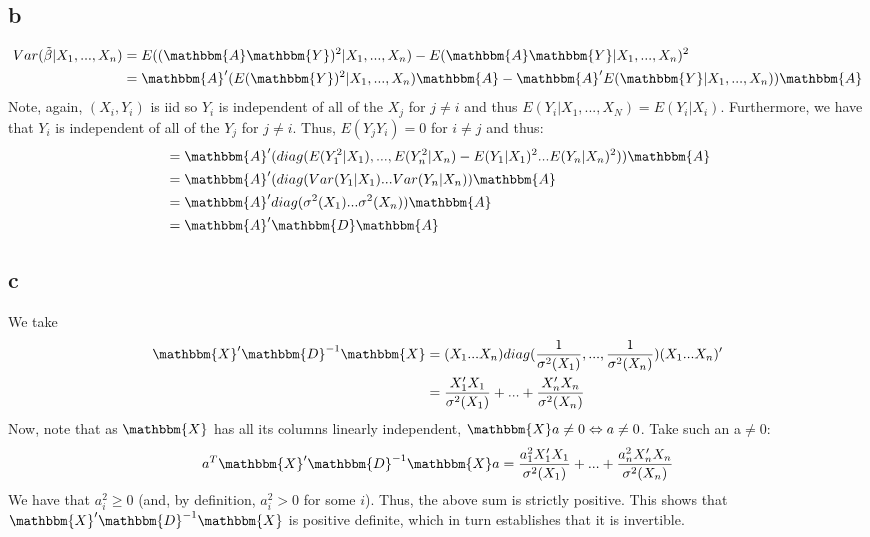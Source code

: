 \documentclass{article}
\begin{document}
\subsection*{b}
\begin{align*}
    Var(\tilde \beta | X_1,...,X_n) & = E((\mathbbm{A} \mathbbm{Y})^2|X_1,...,X_n ) - E(\mathbbm{A} \mathbbm{Y}|X_1,...,X_n )^2 \\
&= \mathbbm{A}'(E( \mathbbm{Y})^2|X_1,...,X_n )\mathbbm{A} - \mathbbm{A}'E( \mathbbm{Y}|X_1,...,X_n )) \mathbbm{A} \\
\end{align*}
Note, again, $(X_i,Y_i)$ is iid so $Y_i$ is independent of all of the $X_j$ for $j \neq i$ and thus $E(Y_i|X_1,...,X_N) = E(Y_i|X_i)$. Furthermore, we have that $Y_i$ is
independent of all of the $Y_j$ for $j \neq i$. Thus, $E(Y_jY_i) = 0 $ for $i \neq j$ and thus:
\begin{align*}
&= \mathbbm{A}'(diag(E( Y_1^2|X_1 ),...,E( Y_n^2|X_n ) - E( Y_1|X_ 1)^2...E( Y_n|X_n )^2)) \mathbbm{A} \\
&= \mathbbm{A}'(diag(Var( Y_1|X_1 )...Var( Y_n|X_n )) \mathbbm{A} \\
& = \mathbbm{A}'diag(\sigma^2(X_1 )...\sigma^2(X_n )) \mathbbm{A} \\ 
& = \mathbbm{A}'\mathbbm{D} \mathbbm{A}
\end{align*}

\subsection*{c}
We take
\begin{align*}
    \mathbbm{X}' \mathbbm{D}^{-1} \mathbbm{X} &= (X_1 ... X_n) diag(\frac{1}{\sigma^2(X_1)},...,\frac{1}{\sigma^2(X_n)})(X_1 ... X_n)'\\
    & =\frac{X_1'X_1}{\sigma^2(X_1)}+...+\frac{X_n'X_n}{\sigma^2(X_n)} \\
\end{align*}
Now, note that as $\mathbbm{X}$ has all its columns linearly independent, $\mathbbm{X}a \neq 0 \Leftrightarrow a \neq 0$. 
Take such an a$\neq 0$: 
\begin{align*}
    a^T \mathbbm{X}' \mathbbm{D}^{-1} \mathbbm{X}a &= \frac{a^2_1X_1'X_1}{\sigma^2(X_1)}+...+\frac{a^2_nX_n'X_n}{\sigma^2(X_n)} \\
\end{align*}
We have that $a_i^2\geq 0$ (and, by definition, $a_i^2>0$ for some $i$). Thus, the above sum is strictly positive. This shows that $\mathbbm{X}' \mathbbm{D}^{-1} \mathbbm{X}$ is positive definite, which in turn establishes that it is invertible.
\end{document}
